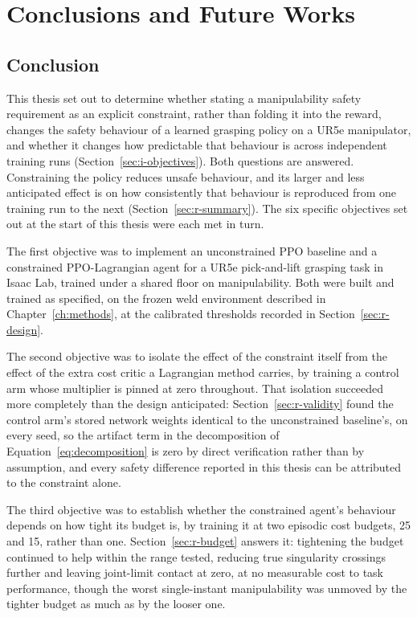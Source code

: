 \chapter{Conclusions and Future Works}\label{ch:conclusion}

\section{Conclusion}\label{sec:c-conclusion}

This thesis set out to determine whether stating a manipulability safety requirement as an
explicit constraint, rather than folding it into the reward, changes the safety behaviour of a
learned grasping policy on a UR5e manipulator, and whether it changes how predictable that
behaviour is across independent training runs (Section~\ref{sec:i-objectives}). Both questions are
answered. Constraining the policy reduces unsafe behaviour, and its larger and less anticipated
effect is on how consistently that behaviour is reproduced from one training run to the next
(Section~\ref{sec:r-summary}). The six specific objectives set out at the start of this thesis
were each met in turn.

The first objective was to implement an unconstrained PPO baseline and a constrained
PPO-Lagrangian agent for a UR5e pick-and-lift grasping task in Isaac Lab, trained under a shared
floor on manipulability. Both were built and trained as specified, on the frozen weld environment
described in Chapter~\ref{ch:methods}, at the calibrated thresholds recorded in
Section~\ref{sec:r-design}.

The second objective was to isolate the effect of the constraint itself from the effect of the
extra cost critic a Lagrangian method carries, by training a control arm whose multiplier is
pinned at zero throughout. That isolation succeeded more completely than the design anticipated:
Section~\ref{sec:r-validity} found the control arm's stored network weights identical to the
unconstrained baseline's, on every seed, so the artifact term in the decomposition of
Equation~\eqref{eq:decomposition} is zero by direct verification rather than by assumption, and
every safety difference reported in this thesis can be attributed to the constraint alone.

The third objective was to establish whether the constrained agent's behaviour depends on how
tight its budget is, by training it at two episodic cost budgets, 25 and 15, rather than one.
Section~\ref{sec:r-budget} answers it: tightening the budget continued to help within the range
tested, reducing true singularity crossings further and leaving joint-limit contact at zero, at no
measurable cost to task performance, though the worst single-instant manipulability was unmoved by
the tighter budget as much as by the looser one.

